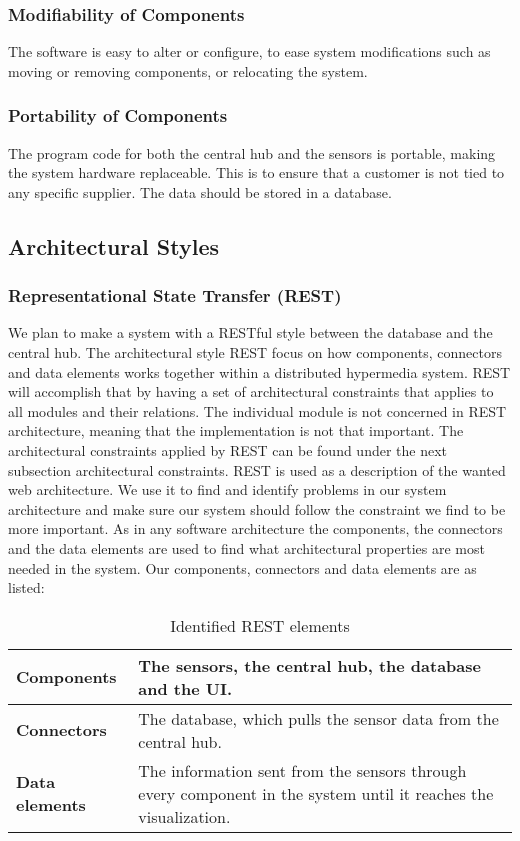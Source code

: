 \documentclass[../document.tex]{subfiles}
\begin{document}
\subsubsection{Modifiability of Components}
The software is easy to alter or configure, to ease system modifications such as moving or removing components, or relocating the system.

\subsubsection{Portability of Components}
The program code for both the central hub and the sensors is portable, making the system hardware replaceable. This is to ensure that a customer is not tied to any specific supplier. The data should be stored in a database.

\subsection{Architectural Styles}
\subsubsection{Representational State Transfer (REST)}
We plan to make a system with a RESTful style between the database and the central hub. The architectural style REST \cite{rest} focus on how components, connectors and data elements works together within a distributed hypermedia system. REST will accomplish that by having a set of architectural constraints that applies to all modules and their relations. The individual module is not concerned in REST architecture, meaning that the implementation is not that important. The architectural constraints applied by REST can be found under the next subsection architectural constraints. REST is used as a description of the wanted web architecture. We use it to find and identify problems in our system architecture and make sure our system should follow the constraint we find to be more important. As in any software architecture the components, the connectors and the data elements are used to find what architectural properties are most needed in the system. Our components, connectors and data elements are as listed:

\begin{table}[H]
	\caption{Identified REST elements}
	\begin{tabularx}{\textwidth}{|X|X|}
		\hline
		\textbf{Components}		& The sensors, the central hub, the database and the UI.  \\ \hline
		\textbf{Connectors}		& The database, which pulls the sensor data from the central hub.  \\ \hline
		\textbf{Data elements}	& The information sent from the sensors through every component in the system until it reaches  the visualization.  \\ \hline
	\end{tabularx}
\end{table}
\end{document}
